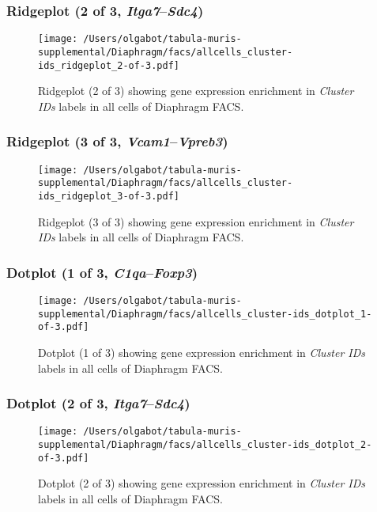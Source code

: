 \clearpage

\subsubsection{Ridgeplot (2 of 3, \emph{Itga7}--\emph{Sdc4})}
\begin{figure}[h]
\centering
\texttt{[image: /Users/olgabot/tabula-muris-supplemental/Diaphragm/facs/allcells\_cluster-ids\_ridgeplot\_2-of-3.pdf]}

\caption{ Ridgeplot (2 of 3)  showing gene expression enrichment in \emph{Cluster IDs} labels in all cells of Diaphragm FACS. }
\end{figure}


\clearpage

\subsubsection{Ridgeplot (3 of 3, \emph{Vcam1}--\emph{Vpreb3})}
\begin{figure}[h]
\centering
\texttt{[image: /Users/olgabot/tabula-muris-supplemental/Diaphragm/facs/allcells\_cluster-ids\_ridgeplot\_3-of-3.pdf]}

\caption{ Ridgeplot (3 of 3)  showing gene expression enrichment in \emph{Cluster IDs} labels in all cells of Diaphragm FACS. }
\end{figure}


\clearpage

\subsubsection{Dotplot (1 of 3, \emph{C1qa}--\emph{Foxp3})}
\begin{figure}[h]
\centering
\texttt{[image: /Users/olgabot/tabula-muris-supplemental/Diaphragm/facs/allcells\_cluster-ids\_dotplot\_1-of-3.pdf]}

\caption{ Dotplot (1 of 3)  showing gene expression enrichment in \emph{Cluster IDs} labels in all cells of Diaphragm FACS. }
\end{figure}


\clearpage

\subsubsection{Dotplot (2 of 3, \emph{Itga7}--\emph{Sdc4})}
\begin{figure}[h]
\centering
\texttt{[image: /Users/olgabot/tabula-muris-supplemental/Diaphragm/facs/allcells\_cluster-ids\_dotplot\_2-of-3.pdf]}

\caption{ Dotplot (2 of 3)  showing gene expression enrichment in \emph{Cluster IDs} labels in all cells of Diaphragm FACS. }
\end{figure}


